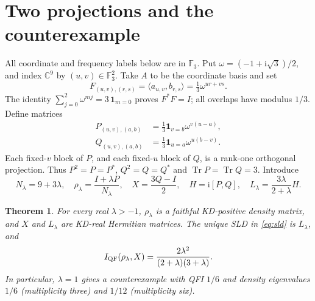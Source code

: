 \documentclass[11pt]{article}
\newcommand{\Tr}{\operatorname{Tr}}
\newcommand{\ii}{\mathrm{i}}
\newtheorem{theorem}{Theorem}
\begin{document}
\section{Two projections and the counterexample}
All coordinate and frequency labels below are in $\mathbb F_3$. Put
$\omega=(-1+\ii\sqrt3)/2$, and index $\mathbb C^9$ by $(u,v)\in\mathbb F_3^2$.
Take $A$ to be the coordinate basis and set
\[
 F_{(u,v),(r,s)}=\langle a_{u,v},b_{r,s}\rangle
     =\tfrac13\omega^{ur+vs}.
\]
The identity $\sum_{j=0}^2\omega^{mj}=3\,\mathbf1_{m=0}$ proves $F^*F=I$;
all overlaps have modulus $1/3$.
Define matrices
\begin{equation}\label{eq:projections}
 \begin{split}
 P_{(u,v),(a,b)}&=\tfrac13\mathbf1_{v=b}\omega^{v(u-a)},\\
 Q_{(u,v),(a,b)}&=\tfrac13\mathbf1_{u=a}\omega^{u(b-v)}.
 \end{split}
\end{equation}
Each fixed-$v$ block of $P$, and each fixed-$u$ block of $Q$, is a rank-one
orthogonal projection. Thus $P^2=P=P^*$, $Q^2=Q=Q^*$ and
$\Tr P=\Tr Q=3$. Introduce
\begin{equation}\label{eq:family}
 N_\lambda=9+3\lambda,\quad
 \rho_\lambda=\frac{I+\lambda P}{N_\lambda},\quad
 X=\frac{3Q-I}{2},\quad
 H=\ii[P,Q],\quad
 L_\lambda=\frac{3\lambda}{2+\lambda}H.
\end{equation}

\begin{theorem}\label{thm:main}
For every real $\lambda>-1$, $\rho_\lambda$ is a faithful KD-positive
density matrix, and $X$ and $L_\lambda$ are KD-real Hermitian matrices.
The unique SLD in \eqref{eq:sld} is $L_\lambda$, and
\begin{equation}\label{eq:qfi}
 I_{\rm QF}(\rho_\lambda,X)
    =\frac{2\lambda^2}{(2+\lambda)(3+\lambda)}.
\end{equation}
In particular, $\lambda=1$ gives a counterexample with QFI $1/6$ and
density eigenvalues $1/6$ (multiplicity three) and $1/12$ (multiplicity six).
\end{theorem}
\end{document}
